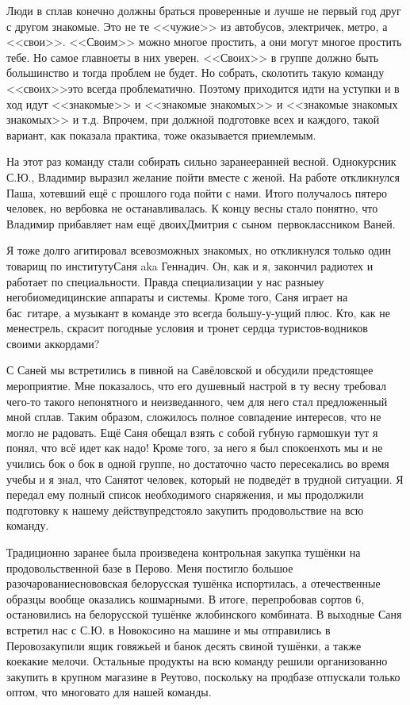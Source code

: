 Люди в сплав конечно должны браться проверенные и лучше не первый год друг с другом знакомые. Это не те <<чужие>> из автобусов, электричек, метро, а <<свои>>. <<Своим>> можно многое простить, а они могут многое простить тебе. Но самое главное\mdash ты в них уверен. <<Своих>> в группе должно быть большинство и тогда проблем не будет. Но собрать, сколотить такую команду <<своих>>\mdash это всегда проблематично. Поэтому приходится идти на уступки и в ход идут <<знакомые>> и <<знакомые знакомых>> и <<знакомые знакомых знакомых>> и т.д. Впрочем, при должной подготовке всех и каждого, такой вариант, как показала практика, тоже оказывается приемлемым.

На этот раз команду стали собирать сильно заранее\mdash ранней весной. Однокурсник С.Ю., Владимир выразил желание пойти вместе с женой. На работе откликнулся Паша, хотевший ещё с прошлого года пойти с нами. Итого получалось пятеро человек, но вербовка не останавливалась. К концу весны стало понятно, что Владимир прибавляет нам ещё двоих\mdash Дмитрия с сыном\sdash~первоклассником Ваней. 

Я тоже долго агитировал всевозможных знакомых, но откликнулся только один товарищ по институту\mdash Саня aka Геннадич. Он, как и я, закончил радиотех и работает по специальности. Правда специализации у нас разные\mdash у него\mdash биомедицинские аппараты и системы. Кроме того, Саня играет на бас\sdash~гитаре, а музыкант в команде это всегда большу-у-ущий плюс. Кто, как не менестрель, скрасит погодные условия и тронет сердца туристов-водников своими аккордами?

С Саней мы встретились в пивной на Савёловской и обсудили предстоящее мероприятие. Мне показалось, что его душевный настрой в ту весну требовал чего-то такого непонятного и неизведанного, чем для него стал предложенный мной сплав. Таким образом, сложилось полное совпадение интересов, что не могло не радовать. Ещё Саня обещал взять с собой губную гармошку\mdash и тут я понял, что всё идет как надо! Кроме того, за него я был спокоен\mdash хоть мы и не учились бок о бок в одной группе, но достаточно часто пересекались во время учебы и я знал, что Саня\mdash тот человек, который не подведёт в трудной ситуации. Я передал ему полный список необходимого снаряжения, и мы продолжили подготовку к нашему действу\mdash предстояло закупить продовольствие на всю команду.

Традиционно заранее была произведена контрольная закупка тушёнки на продовольственной базе в Перово. Меня постигло большое разочарование\mdash снововская белорусская тушёнка испортилась, а отечественные образцы вообще оказались кошмарными. В итоге, перепробовав сортов 6, остановились на белорусской тушёнке жлобинского комбината. В выходные Саня встретил нас с С.Ю. в Новокосино на машине и мы отправились в Перово\mdash закупили ящик говяжьей и банок десять свиной тушёнки, а также кое\sdash какие мелочи. Остальные продукты на всю команду решили организованно закупить в крупном магазине в Реутово, поскольку на продбазе отпускали только оптом, что многовато для нашей команды.  

